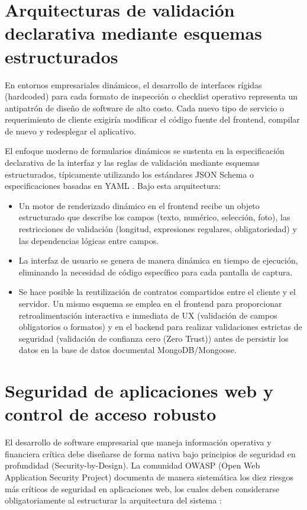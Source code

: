 \section{Arquitecturas de validación declarativa mediante esquemas estructurados}

En entornos empresariales dinámicos, el desarrollo de interfaces rígidas (hardcoded) para cada formato de inspección o checklist operativo representa un antipatrón de diseño de software de alto costo. Cada nuevo tipo de servicio o requerimiento de cliente exigiría modificar el código fuente del frontend, compilar de nuevo y redesplegar el aplicativo.

El enfoque moderno de formularios dinámicos se sustenta en la especificación declarativa de la interfaz y las reglas de validación mediante esquemas estructurados, típicamente utilizando los estándares JSON Schema o especificaciones basadas en YAML \cite{rjsf}. Bajo esta arquitectura:
\begin{itemize}
    \item Un motor de renderizado dinámico en el frontend recibe un objeto estructurado que describe los campos (texto, numérico, selección, foto), las restricciones de validación (longitud, expresiones regulares, obligatoriedad) y las dependencias lógicas entre campos.
    \item La interfaz de usuario se genera de manera dinámica en tiempo de ejecución, eliminando la necesidad de código específico para cada pantalla de captura.
    \item Se hace posible la reutilización de contratos compartidos entre el cliente y el servidor. Un mismo esquema se emplea en el frontend para proporcionar retroalimentación interactiva e inmediata de UX (validación de campos obligatorios o formatos) y en el backend para realizar validaciones estrictas de seguridad (validación de confianza cero (Zero Trust)) antes de persistir los datos en la base de datos documental MongoDB/Mongoose.
\end{itemize}

\section{Seguridad de aplicaciones web y control de acceso robusto}

El desarrollo de software empresarial que maneja información operativa y financiera crítica debe diseñarse de forma nativa bajo principios de seguridad en profundidad (Security-by-Design). La comunidad OWASP (Open Web Application Security Project) documenta de manera sistemática los diez riesgos más críticos de seguridad en aplicaciones web, los cuales deben considerarse obligatoriamente al estructurar la arquitectura del sistema \cite{owasp_top10}:

